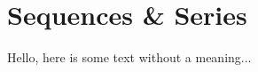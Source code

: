 \documentclass[../main.tex]{subfiles}
\begin{document}
\section{Sequences \& Series}

Hello, here is some text without a meaning...
\end{document}
